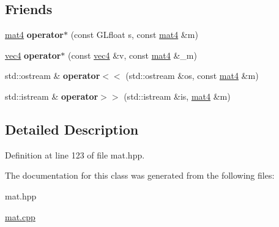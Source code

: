 \subsection*{Friends}
\begin{DoxyCompactItemize}
\item 
\hypertarget{class_angel_1_1mat4_aee74ba4512e3c59e8ed73764e4396d59}{\hyperlink{class_angel_1_1mat4}{mat4} {\bfseries operator$\ast$} (const G\-Lfloat s, const \hyperlink{class_angel_1_1mat4}{mat4} \&m)}\label{class_angel_1_1mat4_aee74ba4512e3c59e8ed73764e4396d59}

\item 
\hypertarget{class_angel_1_1mat4_a43eac2e676368c54279c3babf511fa6b}{\hyperlink{struct_angel_1_1vec4}{vec4} {\bfseries operator$\ast$} (const \hyperlink{struct_angel_1_1vec4}{vec4} \&v, const \hyperlink{class_angel_1_1mat4}{mat4} \&\-\_\-m)}\label{class_angel_1_1mat4_a43eac2e676368c54279c3babf511fa6b}

\item 
\hypertarget{class_angel_1_1mat4_ac079e857a3c74a1b974e4f4619e16adf}{std\-::ostream \& {\bfseries operator$<$$<$} (std\-::ostream \&os, const \hyperlink{class_angel_1_1mat4}{mat4} \&m)}\label{class_angel_1_1mat4_ac079e857a3c74a1b974e4f4619e16adf}

\item 
\hypertarget{class_angel_1_1mat4_a897b946d3a30dbddc811d486bfa4b61a}{std\-::istream \& {\bfseries operator$>$$>$} (std\-::istream \&is, \hyperlink{class_angel_1_1mat4}{mat4} \&m)}\label{class_angel_1_1mat4_a897b946d3a30dbddc811d486bfa4b61a}

\end{DoxyCompactItemize}


\subsection{Detailed Description}


Definition at line 123 of file mat.\-hpp.



The documentation for this class was generated from the following files\-:\begin{DoxyCompactItemize}
\item 
mat.\-hpp\item 
\hyperlink{mat_8cpp}{mat.\-cpp}\end{DoxyCompactItemize}
